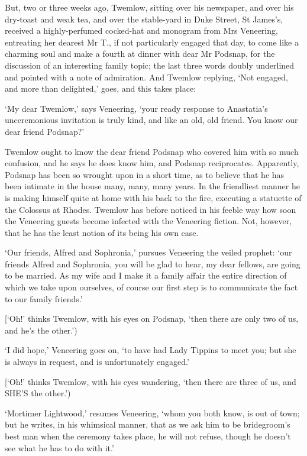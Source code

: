 But, two or three weeks ago, Twemlow, sitting over his newspaper,
and over his dry-toast and weak tea, and over the stable-yard in Duke
Street, St James’s, received a highly-perfumed cocked-hat and monogram
from Mrs Veneering, entreating her dearest Mr T., if not particularly
engaged that day, to come like a charming soul and make a fourth at
dinner with dear Mr Podsnap, for the discussion of an interesting family
topic; the last three words doubly underlined and pointed with a note
of admiration. And Twemlow replying, ‘Not engaged, and more than
delighted,’ goes, and this takes place:

‘My dear Twemlow,’ says Veneering, ‘your ready response to Anastatia’s
unceremonious invitation is truly kind, and like an old, old friend. You
know our dear friend Podsnap?’

Twemlow ought to know the dear friend Podsnap who covered him with so
much confusion, and he says he does know him, and Podsnap reciprocates.
Apparently, Podsnap has been so wrought upon in a short time, as to
believe that he has been intimate in the house many, many, many years.
In the friendliest manner he is making himself quite at home with his
back to the fire, executing a statuette of the Colossus at Rhodes.
Twemlow has before noticed in his feeble way how soon the Veneering
guests become infected with the Veneering fiction. Not, however, that he
has the least notion of its being his own case.

‘Our friends, Alfred and Sophronia,’ pursues Veneering the veiled
prophet: ‘our friends Alfred and Sophronia, you will be glad to hear, my
dear fellows, are going to be married. As my wife and I make it a family
affair the entire direction of which we take upon ourselves, of course
our first step is to communicate the fact to our family friends.’

[‘Oh!’ thinks Twemlow, with his eyes on Podsnap, ‘then there are only
two of us, and he’s the other.’)

‘I did hope,’ Veneering goes on, ‘to have had Lady Tippins to meet you;
but she is always in request, and is unfortunately engaged.’

[‘Oh!’ thinks Twemlow, with his eyes wandering, ‘then there are three of
us, and SHE’S the other.’)

‘Mortimer Lightwood,’ resumes Veneering, ‘whom you both know, is out of
town; but he writes, in his whimsical manner, that as we ask him to be
bridegroom’s best man when the ceremony takes place, he will not refuse,
though he doesn’t see what he has to do with it.’

